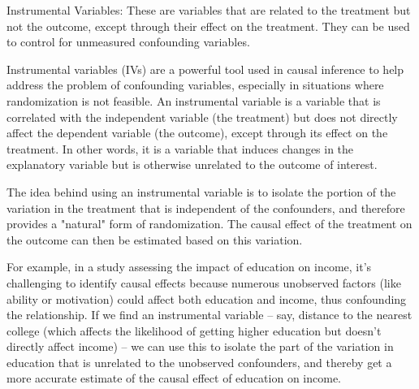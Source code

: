 


Instrumental Variables: These are variables that are related to the treatment but not the outcome, except through their effect on the treatment. They can be used to control for unmeasured confounding variables.

Instrumental variables (IVs) are a powerful tool used in causal inference to help address the problem of confounding variables, especially in situations where randomization is not feasible. An instrumental variable is a variable that is correlated with the independent variable (the treatment) but does not directly affect the dependent variable (the outcome), except through its effect on the treatment. In other words, it is a variable that induces changes in the explanatory variable but is otherwise unrelated to the outcome of interest.

The idea behind using an instrumental variable is to isolate the portion of the variation in the treatment that is independent of the confounders, and therefore provides a "natural" form of randomization. The causal effect of the treatment on the outcome can then be estimated based on this variation.

For example, in a study assessing the impact of education on income, it's challenging to identify causal effects because numerous unobserved factors (like ability or motivation) could affect both education and income, thus confounding the relationship. If we find an instrumental variable – say, distance to the nearest college (which affects the likelihood of getting higher education but doesn't directly affect income) – we can use this to isolate the part of the variation in education that is unrelated to the unobserved confounders, and thereby get a more accurate estimate of the causal effect of education on income.

